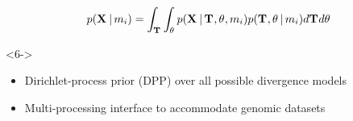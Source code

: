 \begin{frame}[t]
\begin{minipage}[t][0.35\textheight][t]{\linewidth}
\begin{uncoverenv}
\begin{displaybox}[0.85\linewidth]
\begin{minipage}[c][0.1\textheight][c]{\linewidth}
\begin{onlyenv}
                        \[
                            p(\alignmentVector \given \divModel{i}) =
                            \int_{\divTimeMapVector} \int_{\allParameters{}}
                            p(\alignmentVector \given \divTimeMapVector, \allParameters{}, \divModel{i})
                            p(\divTimeMapVector, \allParameters{} \given \divModel{i})
                            d\divTimeMapVector d\allParameters{}
                        \]
                    \end{onlyenv}
                \end{minipage}
            \end{displaybox}
        \end{uncoverenv}

        \vspace{-1mm}

        \begin{uncoverenv}<6->
            \begin{center}
                \begin{itemize}
                    \small
                    \item Dirichlet-process prior (DPP) over all possible divergence
                        models
                    \item Multi-processing interface to accommodate genomic datasets
                \end{itemize}
            \end{center}
        \end{uncoverenv}
    \end{minipage}
\end{frame}




